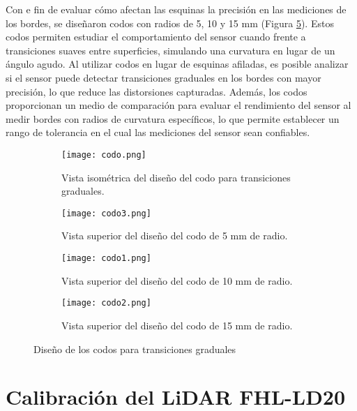 Con e fin de evaluar cómo afectan las esquinas la precisión en las mediciones de los bordes, se diseñaron codos con radios de 5, 10 y 15 mm (Figura \ref{fig: codos}). Estos codos permiten estudiar el comportamiento del sensor cuando frente a transiciones suaves entre superficies, simulando una curvatura en lugar de un ángulo agudo. Al utilizar codos en lugar de esquinas afiladas, es posible analizar si el sensor puede detectar transiciones graduales en los bordes con mayor precisión, lo que reduce las distorsiones capturadas. Además, los codos proporcionan un medio de comparación para evaluar el rendimiento del sensor al medir bordes con radios de curvatura específicos, lo que permite establecer un rango de tolerancia en el cual las mediciones del sensor sean confiables.

\begin{figure}[H]
	\centering
	\begin{subfigure}{0.45\textwidth}
		\centering
		\texttt{[image: codo.png]}
		\caption{Vista isométrica del diseño del codo para transiciones graduales.}
		\label{codo}
	\end{subfigure}
	\hspace{1em}
	\begin{subfigure}{0.45\textwidth}
		\centering
		\texttt{[image: codo3.png]}
		\caption{Vista superior del diseño del codo de 5 mm de radio.}
		\label{codo3}
		\vspace{1em}
	\end{subfigure}
	\begin{subfigure}{0.45\textwidth}
		\centering
		\texttt{[image: codo1.png]}
		\caption{Vista superior del diseño del codo de 10 mm de radio.}
		\label{codo1}
	\end{subfigure}
	\hspace{1em}
	\begin{subfigure}{0.45\textwidth}
		\centering
		\texttt{[image: codo2.png]}
		\caption{Vista superior del diseño del codo de 15 mm de radio.}
		\label{codo2}
	\end{subfigure}
	\caption{Diseño de los codos para transiciones graduales}
	\label{fig: codos}
\end{figure}

\chapter{Calibración del LiDAR FHL-LD20}

